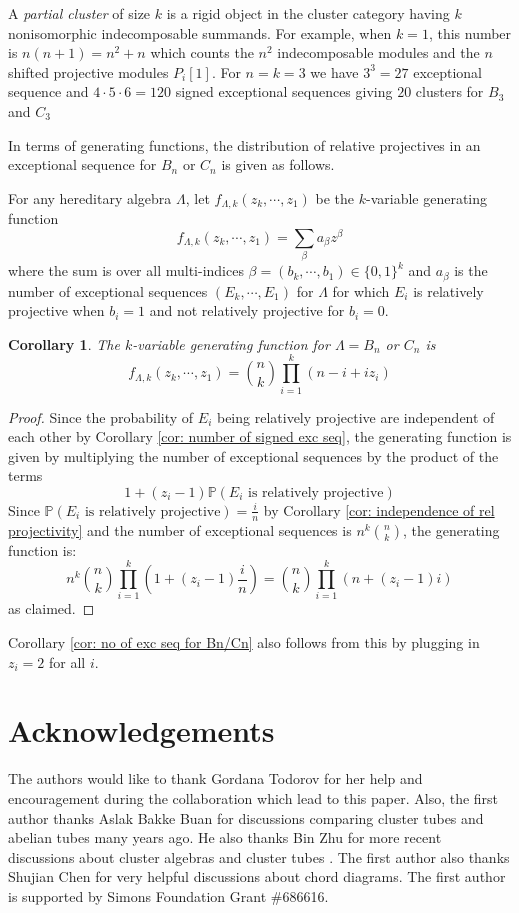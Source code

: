 \documentclass[11pt]{amsart}
\newtheorem{cor}[thm]{Corollary}
\theoremstyle{definition}
\theoremstyle{remark}
\numberwithin{equation}{section}
\newcommand{\field}[1]{\mathbb{#1}}
\newcommand{\PP}{\ensuremath{{\field{P}}}}
\begin{document}
A \emph{partial cluster} of size $k$ is a rigid object in the cluster category having $k$ nonisomorphic indecomposable summands. For example, when $k=1$, this number is $n(n+1)=n^2+n$ which counts the $n^2$ indecomposable modules and the $n$ shifted projective modules $P_i[1]$. For $n=k=3$ we have $3^3=27$ exceptional sequence and $4\cdot 5\cdot 6= 120$ signed exceptional sequences giving $20$ clusters for $B_3$ and $C_3$

In terms of generating functions, the distribution of relative projectives in an exceptional sequence for $B_n$ or $C_n$ is given as follows.

For any hereditary algebra $\Lambda$, let $f_{\Lambda,k}(z_k,\cdots,z_1)$ be the $k$-variable generating function 
\[
	f_{\Lambda,k}(z_k,\cdots,z_1)=\sum_\beta a_\beta z^\beta
\]
where the sum is over all multi-indices $\beta=(b_k,\cdots,b_1)\in \{0,1\}^k$ and $a_\beta$ is the number of exceptional sequences $(E_k,\cdots, E_1)$ for $\Lambda$ for which $E_i$ is relatively projective when $b_i=1$ and not relatively projective for $b_i=0$.

\begin{cor}\label{cor: generating function for rel proj Bn,Cn}
The $k$-variable generating function for $\Lambda=B_n$ or $C_n$ is
\[
	f_{\Lambda,k}(z_k,\cdots,z_1)=\binom nk\prod_{i=1}^k (n-i+iz_i)
\]
\end{cor}


\begin{proof}
Since the probability of $E_i$ being relatively projective are independent of each other by Corollary \ref{cor: number of signed exc seq}, the generating function is given by multiplying the number of exceptional sequences by the product of the terms
\[
	1+(z_i-1)\PP(\text{$E_i$ is relatively projective})
\]
Since $\PP(\text{$E_i$ is relatively projective})=\frac in$ by Corollary \ref{cor: independence of rel projectivity} and the number of exceptional sequences is $n^k\binom nk$, the generating function is:
\[
	n^k\binom nk\prod_{i=1}^k \left(
	1+(z_i-1)\frac in
	\right)=\binom nk \prod_{i=1}^k(n+(z_i-1)i)
\]
as claimed.
\end{proof}

Corollary \ref{cor: no of exc seq for Bn/Cn} also follows from this by plugging in $z_i=2$ for all $i$.

\section*{Acknowledgements}
The authors would like to thank Gordana Todorov for her help and encouragement during the collaboration which lead to this paper. Also, the first author thanks Aslak Bakke Buan for discussions comparing cluster tubes and abelian tubes many years ago. He also thanks Bin Zhu for more recent discussions about cluster algebras and cluster tubes \cite{ZZ}. The first author also thanks Shujian Chen for very helpful discussions about chord diagrams. The first author is supported by Simons Foundation Grant \#686616.
\end{document}
